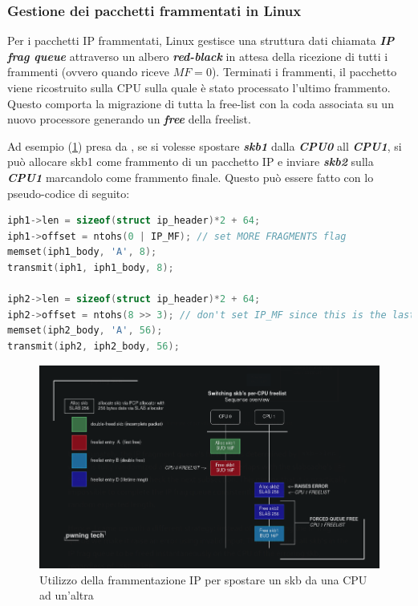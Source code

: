 \documentclass{article}
\begin{document}
\subsubsection{Gestione dei pacchetti frammentati in Linux}
Per i pacchetti IP frammentati, Linux gestisce una struttura dati chiamata \textbf{\textit{IP 
frag queue}} attraverso un albero \textbf{\textit{red-black}} in attesa della ricezione di tutti 
i frammenti (ovvero quando riceve $MF = 0$). Terminati i frammenti, il pacchetto viene 
ricostruito sulla CPU sulla quale è stato processato l'ultimo frammento. Questo comporta 
la migrazione di tutta la free-list con la coda associata su un nuovo processore 
generando un \textbf{\textit{free}} della freelist. 

Ad esempio (\cref{fig:skb-migr}) presa da \cite{NetfilterTablesVulnerability}, se si volesse spostare \textbf{\textit{skb1}} dalla \textbf{\textit{CPU0}} all 
\textbf{\textit{CPU1}}, si può allocare skb1 come frammento di un pacchetto IP e inviare 
\textbf{\textit{skb2}} sulla \textbf{\textit{CPU1}} marcandolo come frammento finale. 
Questo può essere fatto con lo pseudo-codice di seguito:

\begin{lstlisting}[language=C,style=CStyle,caption="Creazione di due frammenti per un pacchetto IP"]
iph1->len = sizeof(struct ip_header)*2 + 64;
iph1->offset = ntohs(0 | IP_MF); // set MORE FRAGMENTS flag 
memset(iph1_body, 'A', 8); 
transmit(iph1, iph1_body, 8); 

iph2->len = sizeof(struct ip_header)*2 + 64; 
iph2->offset = ntohs(8 >> 3); // don't set IP_MF since this is the last packet 
memset(iph2_body, 'A', 56); 
transmit(iph2, iph2_body, 56);
\end{lstlisting}


\begin{figure}[h]
  \begin{center}
    \includegraphics[width=.75\textwidth]{figures/ch1/switching_skb_cpu-1.png}
  \end{center}
  \caption{Utilizzo della frammentazione IP per spostare un skb da una CPU ad un'altra}\label{fig:skb-migr}
\end{figure}
\end{document}

